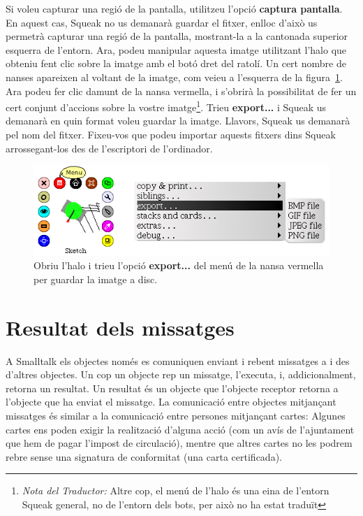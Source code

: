 Si voleu capturar una regió de la pantalla, utilitzeu l'opció \textbf{captura pantalla}. En aquest cas, Squeak no us demanarà guardar el fitxer, enlloc d'això us permetrà capturar una regió de la pantalla, mostrant-la a la cantonada superior esquerra de l'entorn. Ara, podeu manipular aquesta imatge utilitzant l'halo que obteniu fent clic sobre la imatge amb el botó dret del ratolí. Un cert nombre de nanses apareixen al voltant de la imatge, com veieu a l'esquerra de la figura~\ref{fig0508}. Ara podeu fer clic damunt de la nansa vermella, i s'obrirà la possibilitat de fer un cert conjunt d'accions sobre la vostre imatge\footnote{\emph{Nota del Traductor:} Altre cop, el menú de l'halo és una eina de l'entorn Squeak general, no de l'entorn dels bots, per això no ha estat traduït}. Trieu \textbf{export...} i Squeak us demanarà en quin format voleu guardar la imatge. Llavors, Squeak us demanarà pel nom del fitxer. Fixeu-vos que podeu importar aquests fitxers dins Squeak arrossegant-los des de l'escriptori de l'ordinador.     

\begin{figure}[t]
\begin{center}
\includegraphics[scale=3]{Imatges/figura5-8.png}
\end{center}
\caption{Obriu l'halo i trieu l'opció \textbf{\upshape export...} del menú de la nansa vermella per guardar la imatge a disc.}
\label{fig0508}
\end{figure}

\section{Resultat dels missatges}
A Smalltalk els objectes només es comuniquen enviant i rebent missatges a i des d'altres objectes. Un cop un objecte rep un missatge, l'executa, i, addicionalment, retorna  un resultat. Un resultat és un objecte que l'objecte receptor retorna a l'objecte que ha enviat el missatge. La comunicació entre objectes mitjançant missatges és similar a la comunicació entre persones mitjançant cartes: Algunes cartes ens poden exigir la realització d'alguna acció (com un avís de l'ajuntament que hem de pagar l'impost de circulació), mentre que altres cartes no les podrem rebre sense una signatura de conformitat (una carta certificada).

